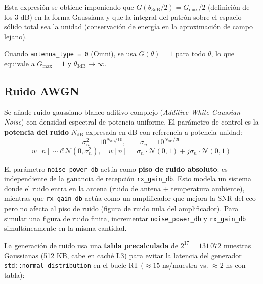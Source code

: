 \documentclass[11pt,a4paper]{article}
\begin{document}
Esta expresión se obtiene imponiendo que $G(\theta_{3\text{dB}}/2) = G_\text{max}/2$
(definición de los 3 dB) en la forma Gaussiana y que la integral del patrón sobre el
espacio sólido total sea la unidad (conservación de energía en la aproximación de campo
lejano).

\begin{infobox}
Cuando \texttt{antenna\_type = 0} (Omni), se usa $G(\theta) = 1$ para todo $\theta$,
lo que equivale a $G_\text{max} = 1$ y $\theta_{3\text{dB}} \to \infty$.
\end{infobox}

\subsection{Ruido AWGN}

Se añade ruido gaussiano blanco aditivo complejo (\textit{Additive White Gaussian Noise})
con densidad espectral de potencia uniforme. El parámetro de control es la \textbf{potencia
del ruido} $N_\text{dB}$ expresada en dB con referencia a potencia unidad:
\begin{equation}
  \sigma_n^2 = 10^{N_\text{dB}/10}, \qquad
  \sigma_n   = 10^{N_\text{dB}/20}
  \label{eq:awgn_sigma}
\end{equation}
\begin{equation}
  w[n] \sim \mathcal{CN}(0, \sigma_n^2), \quad
  w[n] = \sigma_n \cdot \mathcal{N}(0,1) + j \sigma_n \cdot \mathcal{N}(0,1)
  \label{eq:awgn}
\end{equation}

\begin{warnbox}
El parámetro \texttt{noise\_power\_db} actúa como \textbf{piso de ruido absoluto}:
es independiente de la ganancia de recepción \texttt{rx\_gain\_db}. Esto modela un
sistema donde el ruido entra en la antena (ruido de antena + temperatura ambiente),
mientras que \texttt{rx\_gain\_db} actúa como un amplificador que mejora la SNR del eco
pero no afecta al piso de ruido (figura de ruido nula del amplificador). Para simular
una figura de ruido finita, incrementar \texttt{noise\_power\_db} y \texttt{rx\_gain\_db}
simultáneamente en la misma cantidad.
\end{warnbox}

La generación de ruido usa una \textbf{tabla precalculada} de $2^{17} = 131\,072$ muestras
Gaussianas (512 KB, cabe en caché L3) para evitar la latencia del generador
\texttt{std::normal\_distribution} en el bucle RT ($\approx 15$ ns/muestra vs.
$\approx 2$ ns con tabla):
\end{document}
